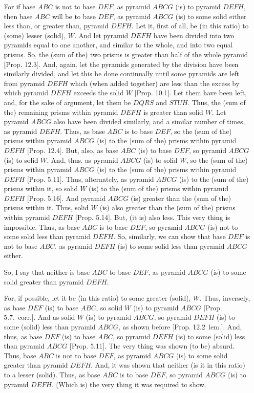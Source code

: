 \begin{Parallel}{}{}
{For if base $ABC$ is not to base $DEF$, as pyramid $ABCG$ (is) to pyramid $DEFH$, then base
$ABC$ will be to base $DEF$, as pyramid $ABCG$ (is) to some solid either less than, or greater
than, pyramid $DEFH$. Let it, first of all, be (in this ratio) to (some) lesser (solid), $W$.
And let pyramid $DEFH$ have been divided into two pyramids equal to one another, and
similar to the whole,  and into two equal prisms. So, the (sum of the) two prisms is greater than
half of the whole pyramid [Prop. 12.3].  And, again, let the pyramids generated
by the division have been similarly divided, and let this be done continually until some pyramids
are left from pyramid $DEFH$ which (when added together) are less than the excess by which pyramid
$DEFH$ exceeds the solid $W$ [Prop. 10.1]. Let them have been left, and, for the sake of argument, let them be $DQRS$ and $STUH$. Thus, the (sum of the) remaining prisms within pyramid $DEFH$ is greater than solid $W$. Let pyramid $ABCG$ also have been divided similarly, and a similar number of times,
as pyramid $DEFH$. Thus, as base $ABC$ is to base $DEF$, so the (sum of the) prisms within pyramid $ABCG$
(is) to the (sum of the) prisms within pyramid $DEFH$ [Prop. 12.4]. But, also, as base
$ABC$ (is) to base $DEF$, so pyramid $ABCG$ (is) to solid $W$. And, thus, as pyramid $ABCG$ (is)
to solid $W$, so the (sum of the) prisms within pyramid $ABCG$ (is) to the (sum of the)
prisms within pyramid $DEFH$ [Prop. 5.11]. Thus, alternately, as pyramid $ABCG$ (is) to the (sum of the) prisms
within it, so solid $W$ (is) to the (sum of the) prisms within pyramid $DEFH$ [Prop. 5.16]. 
And  pyramid $ABCG$ (is) greater than the (sum of the) prisms within it. Thus, solid $W$ (is)
also greater than the (sum of the) prisms within pyramid $DEFH$ [Prop. 5.14]. But,
(it is) also less. This very thing is impossible. Thus, as base $ABC$ is to base $DEF$, so pyramid
$ABCG$ (is) not to some solid less than pyramid $DEFH$. So, similarly, we can show that 
base $DEF$ is not to base $ABC$, as pyramid $DEFH$ (is) to some solid less than pyramid $ABCG$ either.

So, I say that neither is base $ABC$ to base $DEF$, as pyramid $ABCG$ (is) to 
some solid greater
than pyramid $DEFH$.

For, if possible, let it be (in this ratio) to some greater (solid), $W$. Thus, inversely, as base $DEF$ (is) to base
$ABC$, so solid $W$ (is) to pyramid $ABCG$ [Prop. 5.7.~corr.]. And as solid $W$ (is) to pyramid $ABCG$, so pyramid
$DEFH$ (is) to some (solid) less than pyramid $ABCG$, as shown before [Prop. 12.2~lem.]. And, thus, as base $DEF$ (is) to base
$ABC$, so pyramid $DEFH$ (is) to some (solid) less than pyramid 
$ABCG$ [Prop. 5.11]. The very thing
was shown (to be) absurd. Thus, base $ABC$ is not to base $DEF$, as pyramid $ABCG$ (is) to some
solid greater than pyramid $DEFH$. And, it was shown that neither (is it in this ratio) to a lesser (solid). Thus, as base
$ABC$ is to base $DEF$, so pyramid $ABCG$ (is) to pyramid $DEFH$. (Which is) the very
thing it was required to show.}
\end{Parallel}

